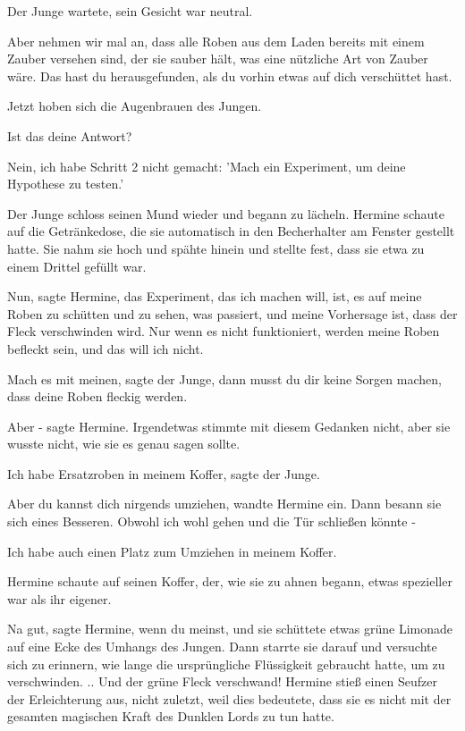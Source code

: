 Der Junge wartete, sein Gesicht war neutral.

\glqq Aber nehmen wir mal an, dass alle Roben aus dem Laden bereits mit einem
Zauber versehen sind, der sie sauber hält, was eine nützliche Art von Zauber
wäre. Das hast du herausgefunden, als du vorhin etwas auf dich verschüttet
hast.\grqq{}

Jetzt hoben sich die Augenbrauen des Jungen.

\glqq Ist das deine Antwort?\grqq{}

\glqq Nein, ich habe Schritt 2 nicht gemacht: 'Mach ein Experiment, um deine
Hypothese zu testen.'\grqq{}

Der Junge schloss seinen Mund wieder und begann zu lächeln. Hermine schaute auf
die Getränkedose, die sie automatisch in den Becherhalter am Fenster gestellt
hatte. Sie nahm sie hoch und spähte hinein und stellte fest, dass sie etwa zu
einem Drittel gefüllt war.

\glqq Nun\grqq{}, sagte Hermine, \glqq das Experiment, das ich machen will, ist,
es auf meine Roben zu schütten und zu sehen, was passiert, und meine Vorhersage
ist, dass der Fleck verschwinden wird. Nur wenn es nicht funktioniert, werden
meine Roben befleckt sein, und das will ich nicht.\grqq{}

\glqq Mach es mit meinen\grqq{}, sagte der Junge, \glqq dann musst du dir keine
Sorgen machen, dass deine Roben fleckig werden.\grqq{}

\glqq Aber -\grqq{} sagte Hermine. Irgendetwas stimmte mit diesem Gedanken
nicht, aber sie wusste nicht, wie sie es genau sagen sollte.

\glqq Ich habe Ersatzroben in meinem Koffer\grqq{}, sagte der Junge.

\glqq Aber du kannst dich nirgends umziehen\grqq{}, wandte Hermine ein. Dann
besann sie sich eines Besseren. \glqq Obwohl ich wohl gehen und die Tür
schließen könnte -\grqq{}

\glqq Ich habe auch einen Platz zum Umziehen in meinem Koffer.\grqq{}

Hermine schaute auf seinen Koffer, der, wie sie zu ahnen begann, etwas
spezieller war als ihr eigener.

\glqq Na gut\grqq{}, sagte Hermine, \glqq wenn du meinst\grqq{}, und sie
schüttete etwas grüne Limonade auf eine Ecke des Umhangs des Jungen. Dann
starrte sie darauf und versuchte sich zu erinnern, wie lange die ursprüngliche
Flüssigkeit gebraucht hatte, um zu verschwinden. .. Und der grüne Fleck
verschwand! Hermine stieß einen Seufzer der Erleichterung aus, nicht zuletzt,
weil dies bedeutete, dass sie es nicht mit der gesamten magischen Kraft des
Dunklen Lords zu tun hatte.

